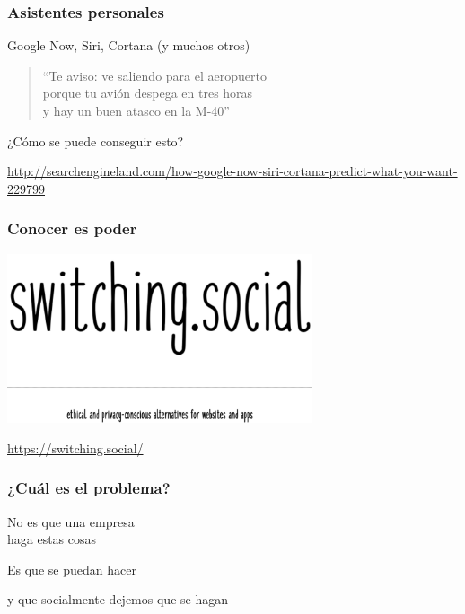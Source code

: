 \documentclass[17pt,aspectratio=169,hyperref=pdfusetitle]{beamer}
\begin{document}

\begin{frame}
\frametitle{Asistentes personales}

\begin{flushright}
  Google Now, Siri, Cortana (y muchos otros)
\end{flushright}

\begin{quote}
  ``Te aviso:
  ve saliendo para el aeropuerto \\
  porque tu avión despega en tres horas \\
  y hay un buen atasco en la M-40'' \\
\end{quote}

¿Cómo se puede conseguir esto?

 {\tiny \url{http://searchengineland.com/how-google-now-siri-cortana-predict-what-you-want-229799}}
\end{frame}



\begin{frame}[fragile]
  \frametitle{Conocer es poder}

  \begin{center}
  \includegraphics[width=9cm]{figs/switching-social}
  \end{center}

  \begin{flushright}
      \url{https://switching.social/} \\
  \end{flushright}

\end{frame}



\begin{frame}
\frametitle{¿Cuál es el problema?}

{\large
\begin{center}
No es que una empresa \\
haga estas cosas
\pause
\vspace{1cm}

Es que se puedan hacer
\pause
\vspace{1cm}

y que socialmente dejemos que se hagan
\end{center}
}
\end{frame}
\end{document}
